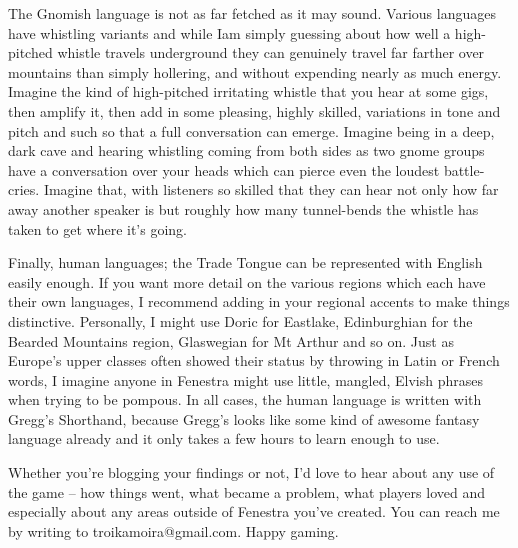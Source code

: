 	The Gnomish language is not as far fetched as it may sound.  Various languages have whistling variants and while Iam simply guessing about how well a high-pitched whistle travels underground they can genuinely travel far farther over mountains than simply hollering, and without expending nearly as much energy.  Imagine the kind of high-pitched irritating whistle that you hear at some gigs, then amplify it, then add in some pleasing, highly skilled, variations in tone and pitch and such so that a full conversation can emerge.  Imagine being in a deep, dark cave and hearing whistling coming from both sides as two gnome groups have a conversation over your heads which can pierce even the loudest battle-cries.  Imagine that, with listeners so skilled that they can hear not only how far away another speaker is but roughly how many tunnel-bends the whistle has taken to get where it's going.

	Finally, human languages; the Trade Tongue can be represented with English easily enough.  If you want more detail on the various regions which each have their own languages, I recommend adding in your regional accents to make things distinctive.  Personally, I might use Doric for Eastlake, Edinburghian for the Bearded Mountains region, Glaswegian for Mt Arthur and so on.  Just as Europe's upper classes often showed their status by throwing in Latin or French words, I imagine anyone in Fenestra might use little, mangled, Elvish phrases when trying to be pompous.  In all cases, the human language is written with Gregg's Shorthand, because Gregg's looks like some kind of awesome fantasy language already and it only takes a few hours to learn enough to use.

	Whether you're blogging your findings or not, I'd love to hear about any use of the game -- how things went, what became a problem, what players loved and especially about any areas outside of Fenestra you've created.  You can reach me by writing to troikamoira@gmail.com.  Happy gaming.

